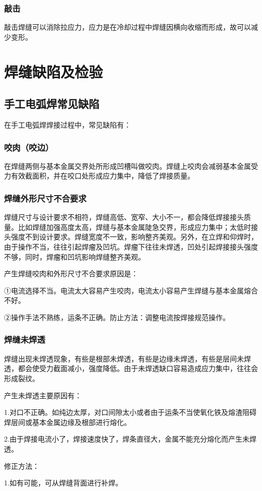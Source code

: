 \documentclass{ctexbook}
\begin{document}
\subsubsection{敲击}
敲击焊缝可以消除拉应力，应力是在冷却过程中焊缝因横向收缩而形成，故可以减少变形。
\section{焊缝缺陷及检验}
\subsection{手工电弧焊常见缺陷}
在手工电弧焊焊接过程中，常见缺陷有：
\subsubsection{咬肉（咬边）}
在焊缝两侧与基本金属交界处所形成凹槽叫做咬肉。焊缝上咬肉会减弱基本金属受力有效截面积，并在咬口处形成应力集中，降低了焊接质量。
\subsubsection{焊缝外形尺寸不合要求}
焊缝尺寸与设计要求不相符，焊缝高低、宽窄、大小不一，都会降低焊接接头质量。比如焊缝加强高度太高，焊缝与基本金属陡急交界，形成应力集中；太低时接头强度不到设计要求。焊缝宽度不一致，影响整齐美观。另外，在立焊和仰焊时，由于操作不当，往往引起焊瘤及凹坑。焊瘤下往往未焊透，凹处引起焊接接头强度不够，同时，焊瘤和凹坑影响焊缝整齐美观。

产生焊缝咬肉和外形尺寸不合要求原因是：

①电流选择不当。电流太大容易产生咬肉，电流太小容易产生焊缝与基本金属熔合不好。

②操作手法不熟练，运条不正确。防止方法：调整电流按焊接规范操作。
\subsubsection{焊缝未焊透}
焊缝出现未焊透现象，有些是根部未焊透，有些是边缘未焊透，有些是层间未焊透，都会使受力截面减小，强度降低。由于未焊透缺口容易造成应力集中，往往会形成裂纹。

产生未焊透主要原因有：

1.对口不正确。如纯边太厚，对口间隙太小或者由于运条不当使氧化铁及熔渣阻碍焊层间或基本金属边缘及根部进行熔化。

2.由于焊接电流小了，焊接速度快了，焊条直径大，金属不能充分熔化而产生未焊透。

修正方法：

1.如有可能，可从焊缝背面进行补焊。
\end{document}
